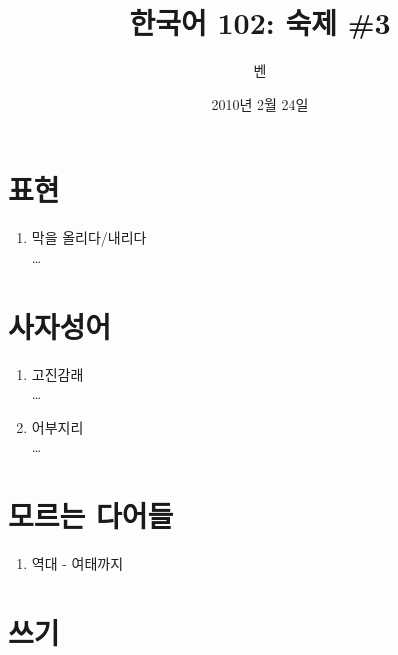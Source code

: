 \documentclass[11pt]{article}
\title{한국어 102: 숙제 \#3}
\author{벤}
\date{2010년 2월 24일}
\begin{document}
\maketitle
\thispagestyle{empty}
\pagestyle{empty}

\section{표현}
\begin{enumerate}
  \item 막을 올리다/내리다 \\
    \ldots
\end{enumerate}

\section{사자성어}
\begin{enumerate}
  \item 고진감래 \\
    \ldots
  \item 어부지리 \\
    \ldots
\end{enumerate}

\section{모르는 다어들}
\begin{enumerate}
  \item 역대 - 여태까지
\end{enumerate}

\section{쓰기}
\doublespacing
\end{document}
